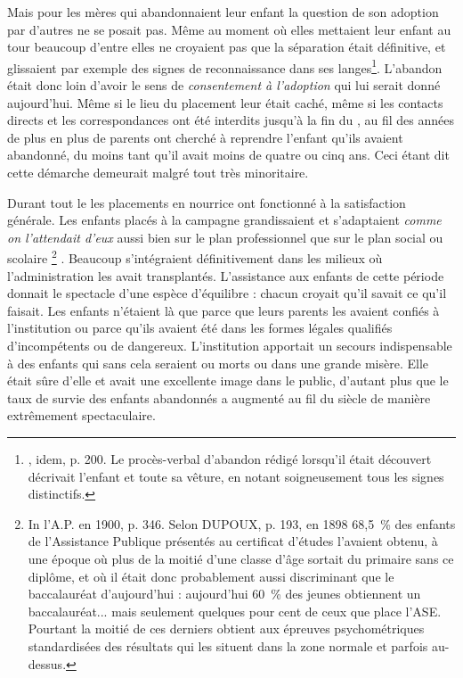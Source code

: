 Mais pour les mères qui abandonnaient leur enfant la question de son adoption par d'autres ne se posait pas. Même au moment où elles mettaient leur enfant au tour beaucoup d'entre elles ne croyaient pas que la séparation était définitive, et glissaient par exemple des signes de reconnaissance dans ses langes\footnote{, idem, p. 200. Le procès-verbal d'abandon rédigé lorsqu'il était découvert décrivait l'enfant et toute sa vêture, en notant soigneusement tous les signes distinctifs.}. L'abandon était donc loin d'avoir le sens de \emph{consentement à l'adoption} qui lui serait donné aujourd'hui. Même si le lieu du placement leur était caché, même si les contacts directs et les correspondances ont été interdits jusqu'à la fin du , au fil des années de plus en plus de parents ont cherché à reprendre l'enfant qu'ils avaient abandonné, du moins tant qu'il avait moins de quatre ou cinq ans. Ceci étant dit cette démarche demeurait malgré tout très minoritaire.

 

 Durant tout le  les placements en nourrice ont fonctionné à la satisfaction générale. Les enfants placés à la campagne grandissaient et s'adaptaient \emph{comme on l'attendait d'eux} aussi bien sur le plan professionnel que sur le plan social ou scolaire%
\footnote{In l'A.P. en 1900, p. 346. Selon DUPOUX, p. 193, en 1898 68,5~\% des enfants de l'Assistance Publique présentés au certificat d'études l'avaient obtenu, à une époque où plus de la moitié d'une classe d'âge sortait du primaire sans ce diplôme, et où il était donc probablement aussi discriminant que le baccalauréat d'aujourd'hui : aujourd'hui 60~\% des jeunes obtiennent un baccalauréat... mais seulement quelques pour cent de ceux que place l'ASE. Pourtant la moitié de ces derniers obtient aux épreuves psychométriques standardisées des résultats qui les situent dans la zone normale et parfois au-dessus.}%
. Beaucoup s'intégraient définitivement dans les milieux où l'administration les avait transplantés. L'assistance aux enfants de cette période donnait le spectacle d'une espèce d'équilibre : chacun croyait qu'il savait ce qu'il faisait. Les enfants n'étaient là que parce que leurs parents les avaient confiés à l'institution ou parce qu'ils avaient été dans les formes légales qualifiés d'incompétents ou de dangereux. L'institution apportait un secours indispensable à des enfants qui sans cela seraient ou morts ou dans une grande misère. Elle était sûre d'elle et avait une excellente image dans le public, d'autant plus que le taux de survie des enfants abandonnés a augmenté au fil du siècle de manière extrêmement spectaculaire.


